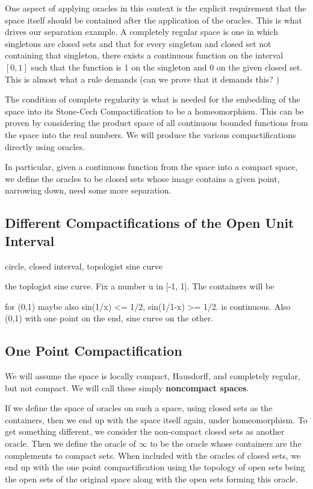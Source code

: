 One aspect of applying oracles in this context is the explicit requirement that the space itself should be contained after the application of the oracles. This is what drives our separation example. A completely regular space is one in which singletons are closed sets and that for every singleton and closed set not containing that singleton, there exists a continuous function on the interval $[0,1]$ such that the function is 1 on the singleton and 0 on the given closed set. This is almost what a rule demands (can we prove that it demands this? ) 

The condition of complete regularity is what is needed for the embedding of the space into its Stone-Cech Compactification to be a homeomorphism. This can be proven by considering the product space of all continuous bounded functions from the space into the real numbers. We will produce the various compactifications directly using oracles. 

In particular, given a continuous function from the space into a compact space, we define the oracles to be closed sets whose image contains a given point, narrowing down, need some more separation. 


\subsection{Different Compactifications of the Open Unit Interval}

circle, closed interval, topologist sine curve

the toplogist sine curve. Fix a number u in [-1, 1]. The containers will be 

for (0,1) maybe also sin(1/x) <= 1/2,  sin(1/1-x) >= 1/2. is continuous. Also (0,1) with one point on the end, sine curve on the other. 


\subsection{One Point Compactification}

We will assume the space is locally compact, Hausdorff, and completely regular, but not compact. We will call these simply \textbf{noncompact spaces}. 

If we define the space of oracles on such a space, using closed sets as the containers, then we end up with the space itself again, under homeomorphism. To get something different, we consider the non-compact closed sets as another oracle. Then we define the oracle of $\infty$ to be the oracle whose containers are the complements to  compact sets. When included with the oracles of closed sets, we end up with the one point compactification using the topology of open sets being the open sets of the original space along with the open sets forming this oracle. 

